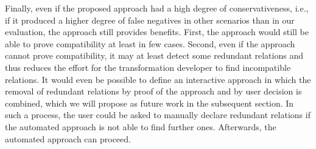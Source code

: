 Finally, even if the proposed approach had a high degree of conservativeness, i.e., if it produced a higher degree of false negatives in other scenarios than in our evaluation, the approach still provides benefits.
First, the approach would still be able to prove compatibility at least in few cases.
Second, even if the approach cannot prove compatibility, it may at least detect some redundant relations and thus reduces the effort for the transformation developer to find incompatible relations.
It would even be possible to define an interactive approach in which the removal of redundant relations by proof of the approach and by user decision is combined, which we will propose as future work in the subsequent section. %
In such a process, the user could be asked to manually declare redundant relations if the automated approach is not able to find further ones.
Afterwards, the automated approach can proceed.




